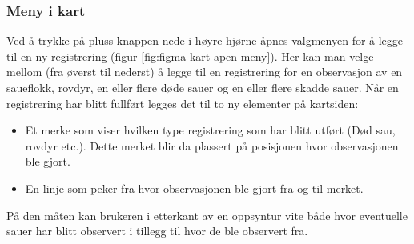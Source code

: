 \subsubsection{Meny i kart}
Ved å trykke på pluss-knappen nede i høyre hjørne åpnes valgmenyen for å legge til en ny registrering (figur \ref{fig:figma-kart-apen-meny}). Her kan man velge mellom (fra øverst til nederst) å legge til en registrering for en observasjon av en saueflokk, rovdyr, en eller flere døde sauer og en eller flere skadde sauer. Når en registrering har blitt fullført legges det til to ny elementer på kartsiden:
\begin{itemize}
    \item Et merke som viser hvilken type registrering som har blitt utført (Død sau, rovdyr etc.). Dette merket blir da plassert på posisjonen hvor observasjonen ble gjort.
    \item En linje som peker fra hvor observasjonen ble gjort fra og til merket.
\end{itemize}

\noindent
På den måten kan brukeren i etterkant av en oppsyntur vite både hvor eventuelle sauer har blitt observert i tillegg til hvor de ble observert fra. 

